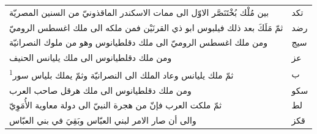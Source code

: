\documentclass[11pt]{article}
\begin{document}
\begin{Arabic}
\noindent{}\par\vspace{0.5mm}
\noindent\begin{tabular}{|p{\dimexpr\textwidth-22mm\relax}|>{\centering\arraybackslash}p{12mm}|}\hline
{}بين مُلْك بُخْتَنَصَّر الاوّل الى ممات الاسكندر الماقذونيّ من السنين المصريّة & تكد \\
{}ثمّ مَلَكَ بعد ذلك فيلبوس ابو ذي القرنَيْن فمن ملكه الى ملك اغسطس الروميّ & رضد \\
{}ومن ملك اغسطس الروميّ الى ملك دقلطيانوس وهو من ملوك النصرانيّة & سيج \\
{}ومن ملك دقلطيانوس الى ملك يليانس الحنيف & عز \\
{}ثمّ ملك يليانس وعاد الملك الى النصرانيّة وثمّ يملك بلياس سور\textsuperscript{1} & ب \\
{}ومن ملك دقلطيانوس الى ملك هرقل صاحب العرب & سكو \\
{}ثمّ ملكت العرب فإنّ من هجرة النبيّ الى دولة معاوية الأُمَوِيّ & لط \\
{}والى أن صار الامر لبني العبّاس وبَقِيَ في بني العبّاس & قكز \\
\hline\end{tabular}
\end{Arabic}
\par\vspace{5mm}
\end{document}
